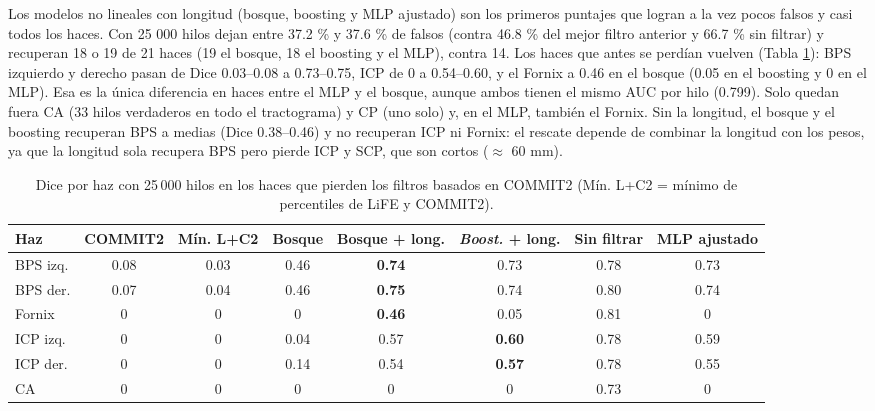 \documentclass[11pt,a4paper]{article}
\begin{document}
Los modelos no lineales con longitud (bosque, boosting y MLP ajustado) son los primeros puntajes que logran a la vez pocos falsos y casi todos los haces. Con 25 000 hilos dejan entre 37.2 \% y 37.6 \% de falsos (contra 46.8 \% del mejor filtro anterior y 66.7 \% sin filtrar) y recuperan 18 o 19 de 21 haces (19 el bosque, 18 el boosting y el MLP), contra 14. Los haces que antes se perdían vuelven (Tabla \ref{tab:haces-perdidos}): BPS izquierdo y derecho pasan de Dice 0.03–0.08 a 0.73–0.75, ICP de 0 a 0.54–0.60, y el Fornix a 0.46 en el bosque (0.05 en el boosting y 0 en el MLP). Esa es la única diferencia en haces entre el MLP y el bosque, aunque ambos tienen el mismo AUC por hilo (0.799). Solo quedan fuera CA (33 hilos verdaderos en todo el tractograma) y CP (uno solo) y, en el MLP, también el Fornix. Sin la longitud, el bosque y el boosting recuperan BPS a medias (Dice 0.38–0.46) y no recuperan ICP ni Fornix: el rescate depende de combinar la longitud con los pesos, ya que la longitud sola recupera BPS pero pierde ICP y SCP, que son cortos ($\approx$ 60 mm).

    \begin{table}[H]
\centering
\small
\begin{tabular}{@{}lccccccc@{}}
\toprule
\textbf{Haz} & \textbf{COMMIT2} & \textbf{M\'in. L+C2} & \textbf{Bosque} & \textbf{Bosque + long.} & \textbf{\textit{Boost.} + long.} & \textbf{Sin filtrar} &\textbf{MLP ajustado}\\
\midrule
BPS izq.  & 0.08 & 0.03 & 0.46 & \textbf{0.74} & 0.73 & 0.78&0.73\\
BPS der.  & 0.07 & 0.04 & 0.46 & \textbf{0.75} & 0.74 & 0.80&	0.74\\
Fornix    & 0    & 0    & 0    & \textbf{0.46} & 0.05 & 0.81&0\\
ICP izq.  & 0    & 0    & 0.04 & 0.57 & \textbf{0.60} & 0.78&0.59\\
ICP der.  & 0    & 0    & 0.14 & 0.54 & \textbf{0.57} & 0.78&0.55\\
CA        & 0    & 0    & 0    & 0    & 0    & 0.73&0\\
\bottomrule
\end{tabular}
\caption{Dice por haz con 25\,000 hilos en los haces que pierden los filtros basados en
COMMIT2 (M\'in. L+C2 = m\'inimo de percentiles de LiFE y COMMIT2).}
\label{tab:haces-perdidos}
\end{table}
\end{document}
